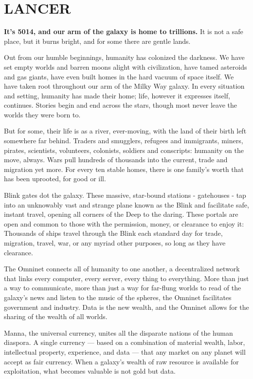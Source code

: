 \chapter{LANCER}
\textbf{\Large It’s 5014, and our arm of the galaxy is home to trillions.} It is not a safe place,
but it burns bright, and for some there are gentle lands.

Out from our humble beginnings, humanity has colonized the darkness. We have set empty
worlds and barren moons alight with civilization, have tamed asteroids and gas giants, have even
built homes in the hard vacuum of space itself. We have taken root throughout our arm of the
Milky Way galaxy. In every situation and setting, humanity has made their home; life, however it
expresses itself, continues. Stories begin and end across the stars, though most never leave the
worlds they were born to.

But for some, their life is as a river, ever-moving, with the land of their birth left somewhere far
behind. Traders and smugglers, refugees and immigrants, miners, pirates, scientists, volunteers,
colonists, soldiers and conscripts: humanity on the move, always. Wars pull hundreds of
thousands into the current, trade and migration yet more. For every ten stable homes, there is
one family’s worth that has been uprooted, for good or ill.

Blink gates dot the galaxy. These massive, star-bound stations - gatehouses - tap into an
unknowably vast and strange plane known as the Blink and facilitate safe, instant travel, opening
all corners of the Deep to the daring. These portals are open and common to those with the
permission, money, or clearance to enjoy it: Thousands of ships travel through the Blink each
standard day for trade, migration, travel, war, or any myriad other purposes, so long as they have
clearance.

The Omninet connects all of humanity to one another, a decentralized network that links every
computer, every server, every thing to everything. More than just a way to communicate, more
than just a way for far-flung worlds to read of the galaxy’s news and listen to the music of the
spheres, the Omninet facilitates government and industry. Data is the new wealth, and the
Omninet allows for the sharing of the wealth of all worlds.

Manna, the universal currency, unites all the disparate nations of the human diaspora. A single
currency — based on a combination of material wealth, labor, intellectual property, experience,
and data — that any market on any planet will accept as fair currency. When a galaxy’s wealth of
raw resource is available for exploitation, what becomes valuable is not gold but data.


